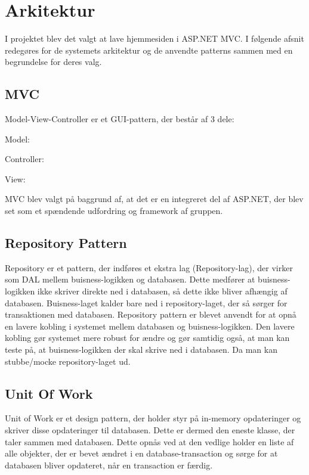 \chapter{Arkitektur}

I projektet blev det valgt at lave hjemmesiden i ASP.NET MVC. I følgende afsnit redegøres for de systemets arkitektur og de anvendte patterns sammen med en begrundelse for deres valg.

\section{MVC}
Model-View-Controller er et GUI-pattern, der består af 3 dele:

Model: 

Controller:

View:

MVC blev valgt på baggrund af, at det er en integreret del af ASP.NET, der blev set som et spændende udfordring og framework af gruppen. 

\section{Repository Pattern}
Repository er et pattern, der indføres et ekstra lag (Repository-lag), der virker som DAL mellem buisness-logikken og databasen. Dette medfører at buisness-logikken ikke skriver direkte ned i databasen, så dette ikke bliver afhængig af databasen. Buisness-laget kalder bare ned i repository-laget, der så sørger for transaktionen med databasen. 
Repository pattern er blevet anvendt for at opnå en lavere kobling i systemet mellem databasen og buisness-logikken. Den lavere kobling gør systemet mere robust for ændre og gør samtidig også, at man kan teste på, at buisness-logikken der skal skrive ned i databasen. Da man kan stubbe/mocke repository-laget ud.

\section{Unit Of Work}
Unit of Work er et design pattern, der holder styr på in-memory opdateringer og skriver disse opdateringer til databasen. Dette er dermed den eneste klasse, der taler sammen med databasen.
Dette opnås ved at den vedlige holder en liste af alle objekter, der er bevet ændret i en database-transaction og sørge for at databasen bliver opdateret, når en transaction er færdig.